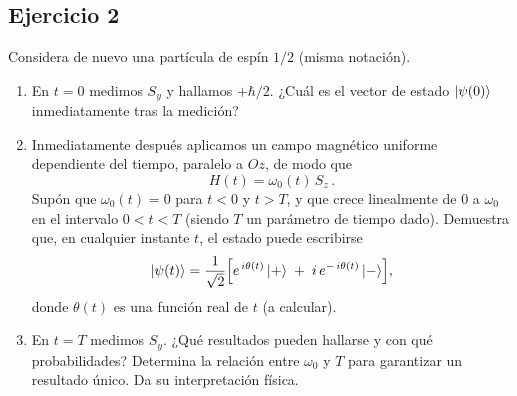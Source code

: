 \documentclass[a4paper,11pt]{article}
\begin{document}
\subsection*{Ejercicio 2}
Considera de nuevo una partícula de espín $1/2$ (misma notación).
\begin{enumerate}
  \item En $t=0$ medimos $S_y$ y hallamos $+\hbar/2$. ¿Cuál es el vector de estado $\ket{\psi(0)}$ inmediatamente tras la medición?
  \item Inmediatamente después aplicamos un campo magnético uniforme dependiente del tiempo, paralelo a $Oz$, de modo que
  \[
    H(t)=\omega_0(t)\,S_z\,.
  \]
  Supón que $\omega_0(t)=0$ para $t<0$ y $t>T$, y que crece linealmente de $0$ a $\omega_0$ en el intervalo $0<t<T$ (siendo $T$ un parámetro de tiempo dado). Demuestra que, en cualquier instante $t$, el estado puede escribirse
  \[
    \ket{\psi(t)}
    = \frac{1}{\sqrt{2}}\Bigl[e^{\,i\theta(t)}\ket{+}
      \;+\; i\,e^{-\,i\theta(t)}\ket{-}\Bigr],
  \]
  donde $\theta(t)$ es una función real de $t$ (a calcular).
  \item En $t=T$ medimos $S_y$. ¿Qué resultados pueden hallarse y con qué probabilidades? Determina la relación entre $\omega_0$ y $T$ para garantizar un resultado único. Da su interpretación física.
\end{enumerate}
\end{document}
